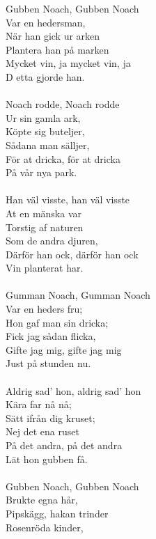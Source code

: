 \vspace{10pt}
\revrpt Gubben Noach, Gubben Noach\\ 
Var en hedersman, \rpt \\ 
När han gick ur arken\\ 
Plantera han på marken\\ 
Mycket vin, ja mycket vin, ja\\ 
D etta gjorde han.\\ 
\\ 
\revrpt Noach rodde, Noach rodde\\ 
Ur sin gamla ark, \rpt \\ 
Köpte sig buteljer,\\ 
Sådana man sälljer,\\ 
För at dricka, för at dricka\\ 
På vår nya park.\\ 
\\  
\revrpt Han väl visste, han väl visste\\ 
At en mänska var \rpt \\ 
Torstig af naturen\\ 
Som de andra djuren,\\ 
Därför han ock, därför han ock\\ 
Vin planterat har.\\ 
 \\ 
\revrpt Gumman Noach, Gumman Noach\\ 
Var en heders fru; \rpt \\ 
Hon gaf man sin dricka;\\ 
Fick jag sådan flicka,\\ 
Gifte jag mig, gifte jag mig\\ 
Just på stunden nu.\\ 
 \\ 
\revrpt Aldrig sad' hon, aldrig sad' hon\\ 
Kära far nå nå; \rpt \\ 
Sätt ifrån dig kruset;\\ 
Nej det ena ruset\\ 
På det andra, på det andra\\ 
Lät hon gubben få.\\ 
 \\ 
\revrpt Gubben Noach, Gubben Noach\\ 
Brukte egna hår, \rpt \\ 
Pipskägg, hakan trinder\\ 
Rosenröda kinder,\\ 
